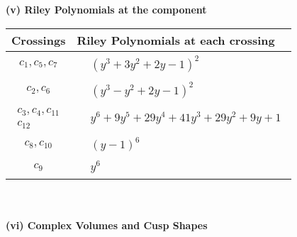 \documentclass[1p]{elsarticle_modified}
\theoremstyle{definition}
\begin{document}
\newpage\renewcommand{\arraystretch}{1}
\flushleft \textbf{(v) Riley Polynomials at the component}\newline \\
\begin{tabular}{m{50pt}|m{274pt}}
Crossings & \hspace{64pt}Riley Polynomials at each crossing \\
\hline $$\begin{aligned}c_{1},c_{5},c_{7}\end{aligned}$$&$\begin{aligned}
&(y^3+3 y^2+2 y-1)^2
\end{aligned}$\\
\hline $$\begin{aligned}c_{2},c_{6}\end{aligned}$$&$\begin{aligned}
&(y^3- y^2+2 y-1)^2
\end{aligned}$\\
\hline $$\begin{aligned}c_{3},c_{4},c_{11}\\c_{12}\end{aligned}$$&$\begin{aligned}
&y^6+9 y^5+29 y^4+41 y^3+29 y^2+9 y+1
\end{aligned}$\\
\hline $$\begin{aligned}c_{8},c_{10}\end{aligned}$$&$\begin{aligned}
&(y-1)^6
\end{aligned}$\\
\hline $$\begin{aligned}c_{9}\end{aligned}$$&$\begin{aligned}
&y^6
\end{aligned}$\\
\hline
\end{tabular}\\~\\
\newpage\flushleft \textbf{(vi) Complex Volumes and Cusp Shapes}
\end{document}
